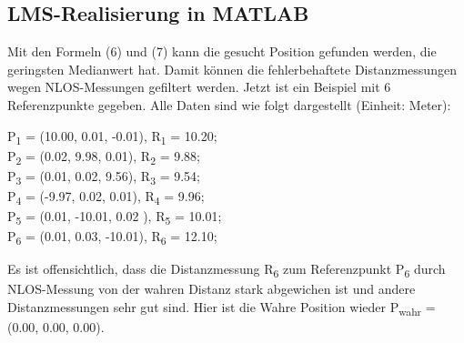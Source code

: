 \subsection{LMS-Realisierung in MATLAB }
Mit den Formeln (6) und (7) kann die gesucht Position gefunden werden, die geringsten Medianwert hat. Damit können die fehlerbehaftete Distanzmessungen wegen NLOS-Messungen gefiltert werden. Jetzt ist ein Beispiel mit 6 Referenzpunkte gegeben. Alle Daten sind wie folgt dargestellt (Einheit: Meter): 
\begin{flushleft}
	P\textsubscript{1} = (10.00, 0.01, -0.01), R\textsubscript{1} = 10.20;\\
	P\textsubscript{2} = (0.02, 9.98, 0.01), R\textsubscript{2} = 9.88;\\
	P\textsubscript{3} = (0.01, 0.02, 9.56), R\textsubscript{3} = 9.54;\\
	P\textsubscript{4} = (-9.97, 0.02, 0.01), R\textsubscript{4} = 9.96;\\
	P\textsubscript{5} = (0.01, -10.01, 0.02 ), R\textsubscript{5} = 10.01;\\
	P\textsubscript{6} = (0.01, 0.03, -10.01), R\textsubscript{6} = 12.10;
\end{flushleft}
Es ist offensichtlich, dass die Distanzmessung R\textsubscript{6} zum Referenzpunkt P\textsubscript{6} durch NLOS-Messung von der wahren Distanz stark abgewichen ist und andere Distanzmessungen sehr gut sind. Hier ist die Wahre Position wieder P\textsubscript{wahr} = (0.00, 0.00, 0.00). 

